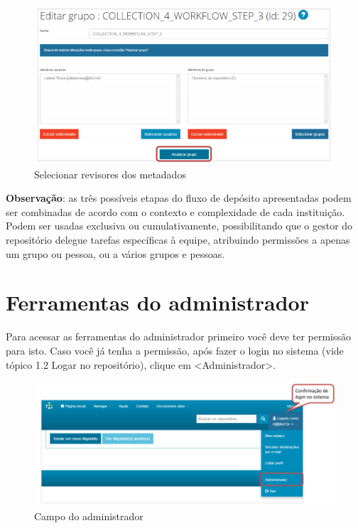 \documentclass[12pt,hidelinks]{article}
\begin{document}
    \begin{figure}[!htp]
                \centering
                \includegraphics[scale=0.8]{figura/Figura49.png}
                \caption{Selecionar revisores dos metadados}
            \label{Rotulo}
        \end{figure}

    \singlespacing
    
    \textbf{Observação}: as três possíveis etapas do fluxo de depósito apresentadas podem ser combinadas de acordo com o contexto e complexidade de cada instituição. Podem ser usadas exclusiva ou cumulativamente, possibilitando que o gestor do repositório delegue tarefas específicas à equipe, atribuindo permissões a apenas um grupo ou pessoa, ou a vários grupos e pessoas.
    
\newpage

\section{Ferramentas do administrador}

\newpage
    
    Para acessar as ferramentas do administrador primeiro você deve ter permissão para isto. Caso você já tenha a permissão, após fazer o login no sistema (vide tópico 1.2 Logar no repositório), clique em <Administrador>.
    
    \begin{figure}[!htp]
                \centering
                \includegraphics[scale=0.7]{figura/Figura50.png}
                \caption{Campo do administrador}
            \label{Rotulo}
        \end{figure}
    
\end{document}
